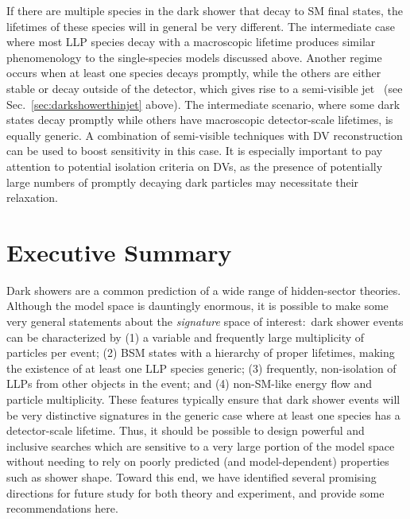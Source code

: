 \begin{enumerate}
If there are multiple species in the dark shower that decay to SM final states, the lifetimes of these species will in general be very different. The intermediate case where most LLP species decay with a macroscopic lifetime produces similar phenomenology to the single-species models discussed above. Another regime occurs when at least one species decays promptly, while the others are either stable or decay outside of the detector, which gives rise to a semi-visible jet~\cite{Cohen:2015toa} (see Sec.~\ref{sec:darkshowerthinjet} above).  The intermediate scenario, where some dark states decay promptly while others have macroscopic detector-scale lifetimes, is equally generic. A combination of semi-visible techniques with  DV reconstruction can be used to boost sensitivity in this case.  It is especially important  to pay attention to potential isolation criteria on DVs, as the presence of potentially large numbers of promptly decaying dark particles may necessitate their relaxation.

\section{Executive Summary}
\label{sec:darkshowersummary}

Dark showers are a common prediction of a wide range of hidden-sector theories. %
Although the model space is dauntingly enormous, it is possible to make some very general statements about the {\em signature} space of interest:~dark shower events can be characterized by (1)  a variable and frequently large multiplicity of particles per event; (2) BSM states with a hierarchy of proper lifetimes, making the existence of at least one LLP species generic; (3)  frequently, non-isolation of LLPs from other objects in the event; and (4) non-SM-like energy flow and particle multiplicity.   These features typically ensure that dark shower events will be very distinctive signatures in the generic case where at least one species has a detector-scale lifetime.  Thus, it should be possible to design powerful and inclusive searches which are sensitive to a very large portion of the model space without needing to rely on poorly predicted (and model-dependent) properties such as shower shape.   Toward this end, we have identified several promising directions for future study for both theory and experiment, and provide some recommendations here.


\end{enumerate}
